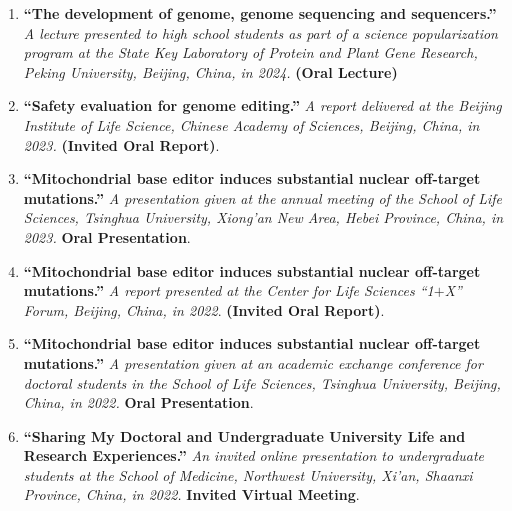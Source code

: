 \begin{enumerate}
    \item \textbf{``The development of genome, genome sequencing and sequencers.''}
    \textit{A lecture presented to high school students as part of a science popularization program at the State Key Laboratory of Protein and Plant Gene Research, Peking University, Beijing, China, in 2024.}
    \textbf{(Oral Lecture)}
    \item \textbf{``Safety evaluation for genome editing.''}
    \textit{A report delivered at the Beijing Institute of Life Science, Chinese Academy of Sciences, Beijing, China, in 2023.} 
    \textbf{(Invited Oral Report)}.
    \item \textbf{``Mitochondrial base editor induces substantial nuclear off-target mutations.''}
    \textit{A presentation given at the annual meeting of the School of Life Sciences, Tsinghua University, Xiong'an New Area, Hebei Province, China, in 2023.} 
    \textbf{Oral Presentation}.
    \item \textbf{``Mitochondrial base editor induces substantial nuclear off-target mutations.''}
    \textit{A report presented at the Center for Life Sciences ``1$+$X'' Forum, Beijing, China, in 2022}. 
    \textbf{(Invited Oral Report)}.
    \item \textbf{``Mitochondrial base editor induces substantial nuclear off-target mutations.''}
    \textit{A presentation given at an academic exchange conference for doctoral students in the School of Life Sciences, Tsinghua University, Beijing, China, in 2022.} 
    \textbf{Oral Presentation}.
    \item \textbf{``Sharing My Doctoral and Undergraduate University Life and Research Experiences.''}
    \textit{An invited online presentation to undergraduate students at the School of Medicine, Northwest University, Xi’an, Shaanxi Province, China, in 2022.} 
    \textbf{Invited Virtual Meeting}.
\end{enumerate}


